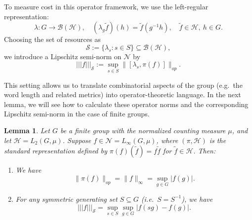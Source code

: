 \documentclass[11pt,reqno]{amsart}
\numberwithin{equation}{section}
\newtheorem{lemma}{Lemma}[section]
\newcommand{\wt}{\widetilde}
\newcommand{\mc}{\mathcal}
\begin{document}
To measure cost in this operator framework, we use the left-regular representation:
\[
    \lambda: G \to \mathcal{B}(\mathcal{H}), \quad (\lambda_g \widetilde{f})(h) = \widetilde{f}(g^{-1}h), \quad \widetilde{f} \in \mathcal{H},\ h \in G.
\]
Choosing the set of resources as 
\[
    \mathcal{S} := \{\lambda_s : s \in S\} \subseteq \mathcal{B}(\mathcal{H}),
\]
we introduce a Lipschitz semi-norm on $\mathcal{N}$ by
\begin{equation}\label{def:Lipschitz norm finite group}
    ||| f |||_{\mathcal{S}} := \sup_{s \in S} \|[\lambda_s, \pi(f)]\|_{op}.
\end{equation}

This setting allows us to translate combinatorial aspects of the group (e.g.\ the word length and related metrics) into operator-theoretic language. In the next lemma, we will see how to calculate these operator norms and the corresponding Lipschitz semi-norm in the case of finite groups.
\begin{lemma}\label{lemma:calculation finite group}
    Let $G$ be a finite group with the normalized counting measure $\mu$, and let $\mc H = L_2(G,\mu)$. Suppose $f \in \mc N = L_{\infty}(G,\mu)$, where $(\pi,\mc H)$ is the standard representation defined by $\pi(f)(\wt f) = f\wt f$ for $\wt f \in \mc H$. Then:
    \begin{enumerate}
        \item We have
        \[
            \|\pi(f)\|_{op} = \|f\|_{\infty} = \sup_{g \in G} |f(g)|.
        \]
        \item For any symmetric generating set $S \subseteq G$ (i.e.\ $S=S^{-1}$), we have
        \[
            |||f|||_{\mc S} = \sup_{s\in S} \sup_{g \in G}|f(sg) - f(g)|.
        \]
    \end{enumerate}
\end{lemma}
\end{document}
